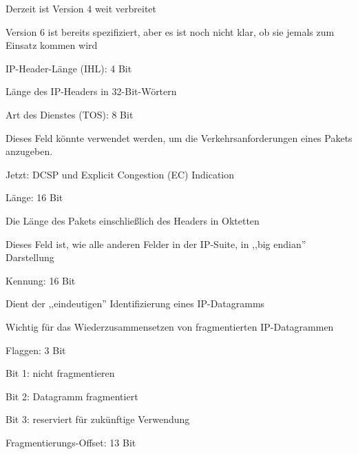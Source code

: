 \documentclass[a4paper]{article}
\begin{document}
\begin{multicols}{3}
\begin{itemize*}
            \begin{itemize*}
                  \item Derzeit ist Version 4 weit verbreitet
                  \item Version 6 ist bereits spezifiziert, aber es ist noch nicht klar, ob sie jemals zum Einsatz kommen wird
            \end{itemize*}
            \item
            IP-Header-Länge (IHL): 4 Bit

            \begin{itemize*}
                  \item Länge des IP-Headers in 32-Bit-Wörtern
            \end{itemize*}
            \item
            Art des Dienstes (TOS): 8 Bit

            \begin{itemize*}
                  \item Dieses Feld könnte verwendet werden, um die Verkehrsanforderungen eines Pakets anzugeben.
                  \item Jetzt: DCSP und Explicit Congestion (EC) Indication
            \end{itemize*}
            \item
            Länge: 16 Bit

            \begin{itemize*}
                  \item Die Länge des Pakets einschließlich des Headers in Oktetten
                  \item Dieses Feld ist, wie alle anderen Felder in der IP-Suite, in ,,big endian'' Darstellung
            \end{itemize*}
            \item
            Kennung: 16 Bit

            \begin{itemize*}
                  \item Dient der ,,eindeutigen'' Identifizierung eines IP-Datagramms
                  \item Wichtig für das Wiederzusammensetzen von fragmentierten IP-Datagrammen
            \end{itemize*}
            \item
            Flaggen: 3 Bit

            \begin{itemize*}
                  \item Bit 1: nicht fragmentieren
                  \item Bit 2: Datagramm fragmentiert
                  \item Bit 3: reserviert für zukünftige Verwendung
            \end{itemize*}
            \item
            Fragmentierungs-Offset: 13 Bit


\end{itemize*}
\end{multicols}
\end{document}
